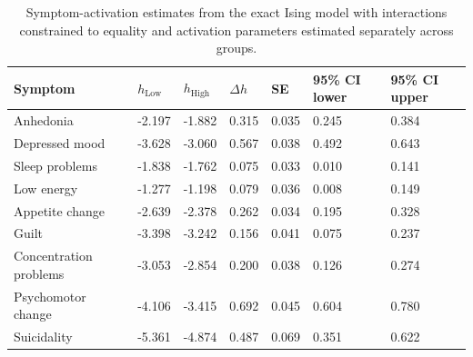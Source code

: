 \begin{table}

\caption{\label{tab:tab:appendix_activation_commonJ}Symptom-activation estimates from the exact Ising model with interactions constrained to equality and activation parameters estimated separately across groups.}
\centering
\begin{tabular}[t]{lllllll}
\toprule
Symptom & $h_{\mathrm{Low}}$ & $h_{\mathrm{High}}$ & $\Delta h$ & SE & 95\% CI lower & 95\% CI upper\\
\midrule
Anhedonia & -2.197 & -1.882 & 0.315 & 0.035 & 0.245 & 0.384\\
Depressed mood & -3.628 & -3.060 & 0.567 & 0.038 & 0.492 & 0.643\\
Sleep problems & -1.838 & -1.762 & 0.075 & 0.033 & 0.010 & 0.141\\
Low energy & -1.277 & -1.198 & 0.079 & 0.036 & 0.008 & 0.149\\
Appetite change & -2.639 & -2.378 & 0.262 & 0.034 & 0.195 & 0.328\\
Guilt & -3.398 & -3.242 & 0.156 & 0.041 & 0.075 & 0.237\\
Concentration problems & -3.053 & -2.854 & 0.200 & 0.038 & 0.126 & 0.274\\
Psychomotor change & -4.106 & -3.415 & 0.692 & 0.045 & 0.604 & 0.780\\
Suicidality & -5.361 & -4.874 & 0.487 & 0.069 & 0.351 & 0.622\\
\bottomrule
\end{tabular}
\end{table}
